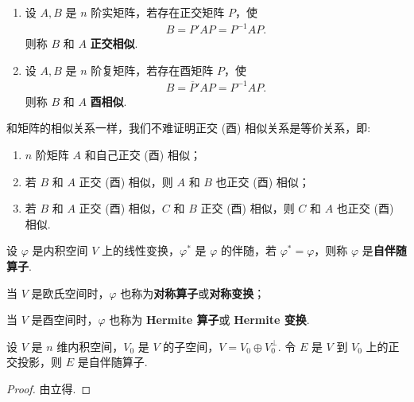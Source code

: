 \documentclass[../../main.tex]{subfiles}
\begin{document}
\begin{definition}[正交相似和酉相似]
\begin{enumerate}
\item 设 $A,B$ 是 $n$ 阶实矩阵，若存在正交矩阵 $P$，使 
\begin{align*}
B = P'AP=P^{-1}AP.
\end{align*}
则称 $B$ 和 $A$ \textbf{正交相似}. 

\item 设 $A,B$ 是 $n$ 阶复矩阵，若存在酉矩阵 $P$，使 
\begin{align*}
B = \overline{P}'AP=P^{-1}AP.
\end{align*}
则称 $B$ 和 $A$ \textbf{酉相似}.
\end{enumerate}
\end{definition}
\begin{remark}
和矩阵的相似关系一样，我们不难证明正交 (酉) 相似关系是等价关系，即:
\begin{enumerate}
\item $n$ 阶矩阵 $A$ 和自己正交 (酉) 相似；

\item 若 $B$ 和 $A$ 正交 (酉) 相似，则 $A$ 和 $B$ 也正交 (酉) 相似；

\item 若 $B$ 和 $A$ 正交 (酉) 相似，$C$ 和 $B$ 正交 (酉) 相似，则 $C$ 和 $A$ 也正交 (酉) 相似. 
\end{enumerate}
\end{remark}

\begin{definition}[自伴随算子]
设 $\varphi$ 是内积空间 $V$ 上的线性变换，$\varphi^*$ 是 $\varphi$ 的伴随，若 $\varphi^* = \varphi$，则称 $\varphi$ 是\textbf{自伴随算子}. 

当 $V$ 是欧氏空间时，$\varphi$ 也称为\textbf{对称算子}或\textbf{对称变换}；

当 $V$ 是酉空间时，$\varphi$ 也称为 \textbf{Hermite 算子}或 \textbf{Hermite 变换}.
\end{definition}

\begin{proposition}
设 $V$ 是 $n$ 维内积空间，$V_0$ 是 $V$ 的子空间，$V = V_0 \oplus V_0^\perp$. 令 $E$ 是 $V$ 到 $V_0$ 上的正交投影，则 $E$ 是自伴随算子. 
\end{proposition}
\begin{proof}
由立得.
\end{proof}
\end{document}
